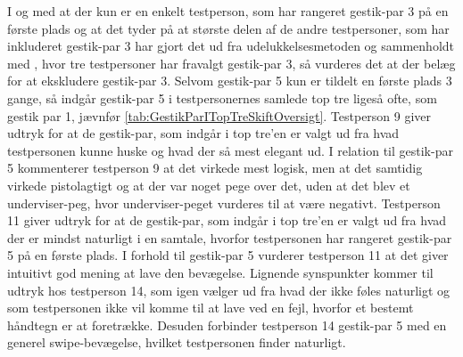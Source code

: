 I og med at der kun er en enkelt testperson, som har rangeret gestik-par 3 på en første plads og at det tyder på at største delen af de andre testpersoner, som har inkluderet gestik-par 3 har gjort det ud fra udelukkelsesmetoden og sammenholdt med , hvor tre testpersoner har fravalgt gestik-par 3, så vurderes det at der belæg for at ekskludere gestik-par 3. \blankline
%
Selvom gestik-par 5 kun er tildelt en første plads 3 gange, så indgår gestik-par 5 i testpersonernes samlede top tre ligeså ofte, som gestik par 1, jævnfør \autoref{tab:GestikParITopTreSkiftOversigt}. Testperson 9 giver udtryk for at de gestik-par, som indgår i top tre'en er valgt ud fra hvad testpersonen kunne huske og hvad der så mest elegant ud. I relation til gestik-par 5 kommenterer testperson 9 at det virkede mest logisk, men at det samtidig virkede pistolagtigt og at der var noget pege over det, uden at det blev et underviser-peg, hvor underviser-peget vurderes til at være negativt. Testperson 11 giver udtryk for at de gestik-par, som indgår i top tre'en er valgt ud fra hvad der er mindst naturligt i en samtale, hvorfor testpersonen har rangeret gestik-par 5 på en første plads. I forhold til gestik-par 5 vurderer testperson 11 at det giver intuitivt god mening at lave den bevægelse. Lignende synspunkter kommer til udtryk hos testperson 14, som igen vælger ud fra hvad der ikke føles naturligt og som testpersonen ikke vil komme til at lave ved en fejl, hvorfor et bestemt håndtegn er at foretrække. Desuden forbinder testperson 14 gestik-par 5 med en generel swipe-bevægelse, hvilket testpersonen finder naturligt. 

